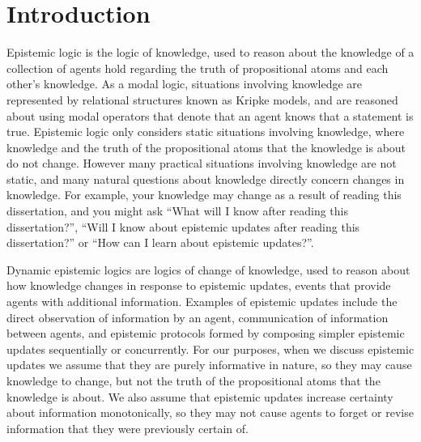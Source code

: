 \chapter{Introduction}\label{introduction}

Epistemic logic is the logic of knowledge, used to reason about the knowledge of a collection of agents hold regarding the truth of propositional atoms and each other's knowledge.
As a modal logic, situations involving knowledge are represented by relational structures known as Kripke models, and are reasoned about using modal operators that denote that an agent knows that a statement is true.
Epistemic logic only considers static situations involving knowledge, where knowledge and the truth of the propositional atoms that the knowledge is about do not change.
However many practical situations involving knowledge are not static, and many natural questions about knowledge directly concern changes in knowledge.
For example, your knowledge may change as a result of reading this dissertation, and you might ask ``What will I know after reading this dissertation?'', ``Will I know about epistemic updates after reading this dissertation?'' or ``How can I learn about epistemic updates?''.

Dynamic epistemic logics are logics of change of knowledge, used to reason about how knowledge changes in response to epistemic updates, events that provide agents with additional information.
Examples of epistemic updates include the direct observation of information by an agent, communication of information between agents, and epistemic protocols formed by composing simpler epistemic updates sequentially or concurrently.
For our purposes, when we discuss epistemic updates we assume that they are purely informative in nature, so they may cause knowledge to change, but not the truth of the propositional atoms that the knowledge is about.
We also assume that epistemic updates increase certainty about information monotonically, so they may not cause agents to forget or revise information that they were previously certain of. 

